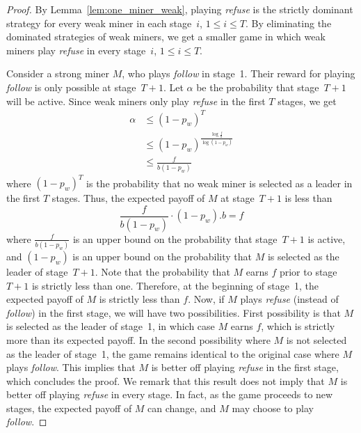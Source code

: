 \documentclass[runningheads]{llncs}
\newcommand{\refuse}{\emph{refuse}}
\newcommand{\follow}{\emph{follow}}
\begin{document}
\begin{proof}
  By Lemma~\ref{lem:one_miner_weak}, playing \refuse{} is the strictly dominant strategy for every weak miner in
  each stage~$i$, $1\leq i \leq T$. By eliminating the dominated strategies of weak miners, we get a smaller game in which weak miners play \refuse{} in every stage~$i$, $1\leq i \leq T$.
  
  Consider a strong miner $M$, who plays \follow{} in stage~1. Their reward for playing \follow{} is only possible at stage~$T+1$. Let $\alpha$ be the probability that stage~$T+1$ will be active. Since weak miners only play \refuse{} in the first $T$ stages, we get 
  \[
  \begin{split}
    \alpha
    &\leq (1-p_w)^T\\
    &\leq (1-p_w)^{\frac{\log \frac{f}{b}}{\log (1-p_w)}}\\
    &\leq \frac{f}{b(1-p_w)}
  \end{split}
  \]
  where $ (1-p_w)^T$ is the probability that no weak miner is selected as a leader in the first $T$ stages. Thus, the expected payoff of $M$ at stage~$T+1$ is less than 
  \[
    \frac{f}{b(1-p_w)}\cdot (1-p_w).b=f
  \]
  where $ \frac{f}{b(1-p_w)}$ is an upper bound on the probability that stage~$T+1$ is active, and $(1-p_w)$ is an upper bound on the probability that $M$ is selected as the leader of stage~$T+1$. Note that the probability that $M$ earns $f$ prior to stage~$T+1$ is strictly less than one. Therefore, at the beginning of stage~1, the expected payoff of $M$ is strictly less than $f$. Now, if $M$ plays \refuse{} (instead of \follow{}) in the first stage, we will have two possibilities. First possibility is that $M$ is selected as the leader of stage~1, in which case $M$ earns $f$, 
  which is strictly more than its expected payoff. In the second possibility where $M$ is not selected as the leader of stage~1, the game remains identical to the original case where $M$ plays \follow{}. This implies that $M$ is better off playing \refuse{} in the first stage, which concludes the proof. We remark that this result does not imply that $M$ is better off playing \refuse{} in every stage. In fact, as the game proceeds to new stages, the expected payoff of $M$ can change, and  $M$ may choose to play \follow{}.
  
\end{proof}
\end{document}
